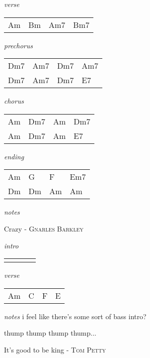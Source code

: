 \documentclass[12pt]{article}
\begin{document}
\textit{verse}

\begin{tabular}{|P{1.25in}|P{1.25in}|P{1.25in}|P{1.25in}|}
  Am  & Bm  & Am7  & Bm7  \\
\end{tabular}

\textit{prechorus}

\begin{tabular}{|P{1.25in}|P{1.25in}|P{1.25in}|P{1.25in}|}
  Dm7  & Am7  &  Dm7 &  Am7 \\
  Dm7  & Am7  &  Dm7 &  E7 \\
\end{tabular}

\textit{chorus}

\begin{tabular}{|P{1.25in}|P{1.25in}|P{1.25in}|P{1.25in}|}
  Am  & Dm7  & Am  & Dm7  \\
  Am  & Dm7  & Am  & E7  \\
\end{tabular}

\textit{ending}

\begin{tabular}{|P{1.25in}|P{1.25in}|P{1.25in}|P{1.25in}|}
  Am  & G  & F  & Em7  \\
  Dm  & Dm  & Am  & Am  \\
\end{tabular}

\textit{notes}

\newpage
{\Huge Crazy} {\huge - \textsc{Gnarles Barkley}}

\huge
\textit{intro}

\begin{tabular}{|P{1.25in}|P{1.25in}|P{1.25in}|P{1.25in}|}
    &   &   &   \\
\end{tabular}

\textit{verse}

\begin{tabular}{|P{1.25in}|P{1.25in}|P{1.25in}|P{1.25in}|}
   Am &  C & F  &  E \\
\end{tabular}

\textit{notes}
i feel like there's some sort of bass intro?


thump thump thump thump...
\newpage

{\Huge It's good to be king} {\huge - \textsc{Tom Petty}}
\end{document}
